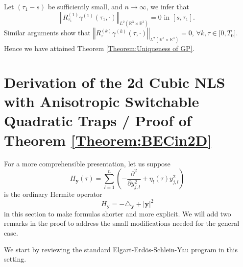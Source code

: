 \documentclass[reqno]{amsart}
\theoremstyle{plain}
\numberwithin{equation}{section}
\begin{document}
Let $\left( \tau _{1}-s\right) $ be sufficiently small, and $n\rightarrow
\infty $, we infer that 
\begin{equation*}
\left\Vert R_{\tau _{1}}^{(1)}\gamma ^{(1)}(\tau _{1},\cdot )\right\Vert
_{L^{2}(\mathbb{R}^{3}\times \mathbb{R}^{3})}=0\text{ in }[s,\tau _{1}].
\end{equation*}Similar arguments show that $\left\Vert R_{\tau }^{(k)}\gamma ^{(k)}(\tau
,\cdot )\right\Vert _{L^{2}(\mathbb{R}^{3}\times \mathbb{R}^{3})}=0$, $\forall k,\tau \in \lbrack 0,T_{0}].$ Hence we have attained Theorem \ref{Theorem:Uniqueness of GP}.

\section{Derivation of the 2d Cubic NLS with Anisotropic Switchable
Quadratic Traps / Proof of Theorem \protect\ref{Theorem:BECin2D}\label{Sec:ProofOfBEC}}

For a more comprehensible presentation, let us suppose\begin{equation*}
H_{\mathbf{y}}(\tau )=\sum_{l=1}^{n}\left( -\frac{\partial ^{2}}{\partial
y_{j,l}^{2}}+\eta _{l}(\tau )y_{j,l}^{2}\right)
\end{equation*}is the ordinary Hermite operator\begin{equation*}
H_{\mathbf{y}}=-\triangle _{\mathbf{y}}+\left\vert \mathbf{y}\right\vert ^{2}
\end{equation*}
in this section to make formulas shorter and more explicit. We will add two
remarks in the proof to address the small modifications needed for the
general case.

We start by reviewing the standard Elgart-Erd\"{o}s-Schlein-Yau program in
this setting.
\end{document}
